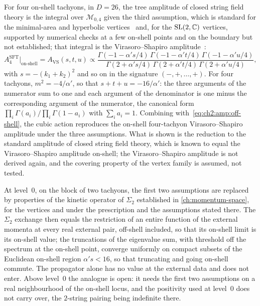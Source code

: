 For four on-shell tachyons, in $D = 26$, the tree amplitude of closed string field theory is the integral over $\mathcal M_{0, 4}$ given the third assumption, which is standard for the minimal-area and hyperbolic vertices~\cite{Zwiebach:1993:ClosedStringField,Erbin:2021:StringFieldTheory} and, for the $\mathrm{SL}(2, \mathbb{C})$ vertices, supported by numerical checks at a few on-shell points and on the boundary but not established; that integral is the Virasoro--Shapiro amplitude~\cite{Polchinski:2005:StringTheoryVolume}:
\begin{equation}
  \label{eq:ch2:amp:vs}
  A_4^{\text{SFT}} \Big|_{\text{on-shell}}
    = A_{\text{VS}}(s, t, u)
    \propto \frac{\Gamma(-1 - \alpha' s / 4) \, \Gamma(-1 - \alpha' t / 4) \, \Gamma(-1 - \alpha' u / 4)}{\Gamma(2 + \alpha' s / 4) \, \Gamma(2 + \alpha' t / 4) \, \Gamma(2 + \alpha' u / 4)},
\end{equation}
with $s = - (k_1 + k_2)^2$ and so on in the signature $(-, +, \ldots, +)$.
For four tachyons, $m^2 = - 4 / \alpha'$, so that $s + t + u = - 16 / \alpha'$: the three arguments of the numerator sum to one and each argument of the denominator is one minus the corresponding argument of the numerator, the canonical form $\prod_i \Gamma(a_i) / \prod_i \Gamma(1 - a_i)$ with $\sum_i a_i = 1$.
Combining with~\eqref{eq:ch2:amp:off-shell}, the cubic action reproduces the on-shell four-tachyon Virasoro--Shapiro amplitude under the three assumptions.
What is shown is the reduction to the standard amplitude of closed string field theory, which is known to equal the Virasoro--Shapiro amplitude on-shell; the Virasoro--Shapiro amplitude is not derived again, and the covering property of the vertex family is assumed, not tested.

At level~$0$, on the block of two tachyons, the first two assumptions are replaced by properties of the kinetic operator of $\Sigma_2$ established in \cref{ch:momentum-space}, for the vertices and under the prescription and the assumptions stated there.
The $\Sigma_2$ exchange then equals the restriction of an entire function of the external momenta at every real external pair, off-shell included, so that its on-shell limit is its on-shell value; the truncations of the eigenvalue sum, with threshold off the spectrum at the on-shell point, converge uniformly on compact subsets of the Euclidean on-shell region $\alpha' s < 16$, so that truncating and going on-shell commute.
The propagator alone has no value at the external data and does not enter.
Above level~$0$ the analogue is open: it needs the first two assumptions on a real neighbourhood of the on-shell locus, and the positivity used at level~$0$ does not carry over, the $2$-string pairing being indefinite there.

